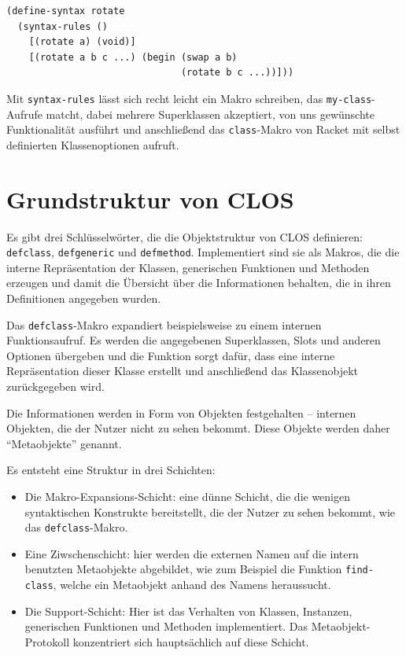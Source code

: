 \begin{lstlisting}
(define-syntax rotate
  (syntax-rules ()
    [(rotate a) (void)]
    [(rotate a b c ...) (begin (swap a b)
                               (rotate b c ...))]))
\end{lstlisting}

Mit \texttt{syntax-rules} lässt sich recht leicht ein Makro schreiben, das  \texttt{my-class}-Aufrufe matcht, dabei mehrere Superklassen akzeptiert, von uns gewünschte Funktionalität ausführt und anschließend das \texttt{class}-Makro von Racket mit selbst definierten Klassenoptionen aufruft.


\section{Grundstruktur von CLOS}
Es gibt drei Schlüsselwörter, die die Objektstruktur von CLOS definieren:  \texttt{defclass}, \texttt{defgeneric} und \texttt{defmethod}. Implementiert sind sie als Makros, die die interne Repräsentation der Klassen, generischen Funktionen und Methoden erzeugen und damit die Übersicht über die Informationen behalten, die in ihren Definitionen angegeben wurden.

Das \texttt{defclass}-Makro expandiert beispielsweise zu einem internen Funktionsaufruf. Es werden die angegebenen Superklassen, Slots und anderen Optionen übergeben und die Funktion sorgt dafür, dass eine interne Repräsentation dieser Klasse erstellt und anschließend das Klassenobjekt zurückgegeben wird.

Die Informationen werden in Form von Objekten festgehalten -- internen Objekten, die der Nutzer nicht zu sehen bekommt. Diese Objekte werden daher ``Metaobjekte'' genannt.

Es entsteht eine Struktur in drei Schichten:
\begin{itemize}
 \item Die Makro-Expansions-Schicht: eine dünne Schicht, die die wenigen syntaktischen Konstrukte bereitstellt, die der Nutzer zu sehen bekommt, wie das \texttt{defclass}-Makro.
 \item Eine Ziwschenschicht: hier werden die externen Namen auf die intern benutzten Metaobjekte abgebildet, wie zum Beispiel die Funktion \texttt{find-class}, welche ein Metaobjekt anhand des Namens heraussucht.
 \item Die Support-Schicht: Hier ist das Verhalten von Klassen, Instanzen, generischen Funktionen und Methoden implementiert. Das Metaobjekt-Protokoll konzentriert sich hauptsächlich auf diese Schicht.
\end{itemize}

